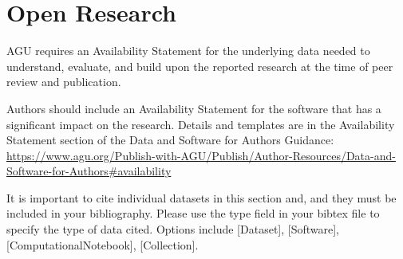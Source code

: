 \documentclass[draft]{agujournal2019}
\begin{document}
%
%

%

%



\section{Open Research}




AGU requires an Availability Statement for the underlying data needed to understand, evaluate, and build upon the reported research at the time of peer review and publication.

Authors should include an Availability Statement for the software that has a significant impact on the research. Details and templates are in the Availability Statement section of the Data and Software for Authors Guidance: \url{https://www.agu.org/Publish-with-AGU/Publish/Author-Resources/Data-and-Software-for-Authors#availability}

It is important to cite individual datasets in this section and, and they must be included in your bibliography. Please use the type field in your bibtex file to specify the type of data cited. Options include [Dataset], [Software], [ComputationalNotebook], [Collection].
%
\end{document}
